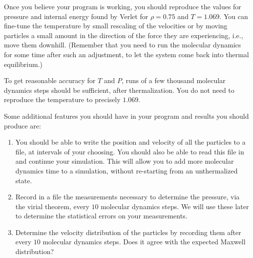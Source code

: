 Once you believe your program is working, you should reproduce the values for pressure and
internal energy found by Verlet for $\rho = 0.75$ and $T = 1.069$. You can fine-tune the
temperature by small rescaling of the velocities or by moving particles a small amount in
the direction of the force they are experiencing, i.e., move them downhill. (Remember that
you need to run the molecular dynamics for some time after such an adjustment, to let the
system come back into thermal equilibrium.)

To get reasonable accuracy for $T$ and $P$, runs of a few thousand molecular dynamics steps
should be sufficient, after thermalization. You do not need to reproduce the temperature to
precisely $1.069$.

Some additional features you should have in your program and results you should produce are:

\begin{enumerate}
    \item You should be able to write the position and velocity of all the particles to a
          file, at intervals of your choosing. You should also be able to read this file in
          and continue your simulation. This will allow you to add more molecular dynamics
          time to a simulation, without re-starting from an unthermalized state.
    \item Record in a file the measurements necessary to determine the pressure, via the
          virial theorem, every $10$ molecular dynamics steps. We will use these later to
          determine the statistical errors on your measurements.
    \item Determine the velocity distribution of the particles by recording them after every
          $10$ molecular dynamics steps. Does it agree with the expected Maxwell distribution?
\end{enumerate}
